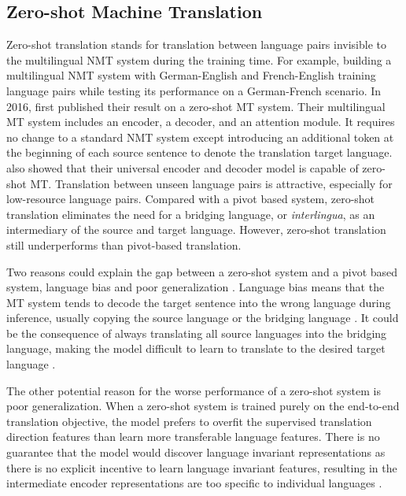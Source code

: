 \documentclass[thesis,fonts=libertine]{cluu}
\begin{document}
\subsection{Zero-shot Machine Translation}
\label{sec:zero_shot_mt}

Zero-shot translation stands for translation between language pairs invisible to the multilingual NMT system during the training time. For example, building a multilingual NMT system with German-English and French-English training language pairs while testing its performance on a German-French scenario. In 2016, \textcite{Johnson:2016aa} first published their result on a zero-shot MT system. Their multilingual MT system includes an encoder, a decoder, and an attention module. It requires no change to a standard NMT system except introducing an additional token at the beginning of each source sentence to denote the translation target language. \textcite{Ha:2016aa} also showed that their universal encoder and decoder model is capable of zero-shot MT. Translation between unseen language pairs is attractive, especially for low-resource language pairs. Compared with a pivot based system, zero-shot translation eliminates the need for a bridging language, or \textit{interlingua}, as an intermediary of the source and target language. However, zero-shot translation still underperforms than pivot-based translation.

Two reasons could explain the gap between a zero-shot system and a pivot based system, language bias \parencite{Ha:2016aa, Ha:2017aa, Arivazhagan:2019aa} and poor generalization \parencite{Arivazhagan:2019aa}. Language bias means that the MT system tends to decode the target sentence into the wrong language during inference, usually copying the source language or the bridging language \parencite{Ha:2016aa}. It could be the consequence of always translating all source languages into the bridging language, making the model difficult to learn to translate to the desired target language \parencite{Arivazhagan:2019aa}.

The other potential reason for the worse performance of a zero-shot system is poor generalization. When a zero-shot system is trained purely on the end-to-end translation objective, the model prefers to overfit the supervised translation direction features than learn more transferable language features. There is no guarantee that the model would discover language invariant representations as there is no explicit incentive to learn language invariant features, resulting in the intermediate encoder representations are too specific to individual languages \parencite{Arivazhagan:2019aa}.
\end{document}
